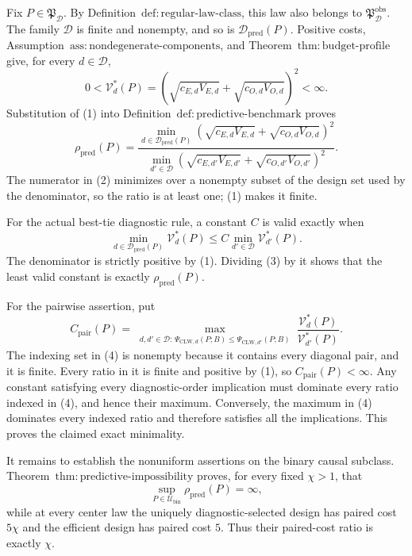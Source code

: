 Fix \(P\in\mathfrak P_{\mathcal D}\).  By Definition~\(\mathrm{def{:}regular\text{-}law\text{-}class}\), this law also belongs to \(\mathfrak P_{\mathcal D}^{\mathrm{obs}}\).  The family \(\mathcal D\) is finite and nonempty, and so is \(\mathcal D_{\mathrm{pred}}(P)\).  Positive costs, Assumption~\(\mathrm{ass{:}nondegenerate\text{-}components}\), and Theorem~\(\mathrm{thm{:}budget\text{-}profile}\) give, for every \(d\in\mathcal D\),
\[
 0<\mathcal V_d^*(P)
 =\left(\sqrt{c_{E,d}V_{E,d}}+
          \sqrt{c_{O,d}V_{O,d}}\right)^2<\infty.       \tag{1}
\]
Substitution of (1) into Definition~\(\mathrm{def{:}predictive\text{-}benchmark}\) proves
\[
 \rho_{\mathrm{pred}}(P)
 =\frac{\min_{d\in\mathcal D_{\mathrm{pred}}(P)}
 (\sqrt{c_{E,d}V_{E,d}}+\sqrt{c_{O,d}V_{O,d}})^2}
 {\min_{d'\in\mathcal D}
 (\sqrt{c_{E,d'}V_{E,d'}}+\sqrt{c_{O,d'}V_{O,d'}})^2}.
 \tag{2}
\]
The numerator in (2) minimizes over a nonempty subset of the design set used by the denominator, so the ratio is at least one; (1) makes it finite.

For the actual best-tie diagnostic rule, a constant \(C\) is valid exactly when
\[
 \min_{d\in\mathcal D_{\mathrm{pred}}(P)}\mathcal V_d^*(P)
 \le C\min_{d'\in\mathcal D}\mathcal V_{d'}^*(P).
 \tag{3}
\]
The denominator is strictly positive by (1).  Dividing (3) by it shows that the least valid constant is exactly \(\rho_{\mathrm{pred}}(P)\).

For the pairwise assertion, put
\[
 C_{\mathrm{pair}}(P)=
 \max_{\substack{d,d'\in\mathcal D:\,
 \Psi_{\mathrm{CLW},d}(P;B)\le
 \Psi_{\mathrm{CLW},d'}(P;B)}}
 \frac{\mathcal V_d^*(P)}{\mathcal V_{d'}^*(P)}.        \tag{4}
\]
The indexing set in (4) is nonempty because it contains every diagonal pair, and it is finite.  Every ratio in it is finite and positive by (1), so \(C_{\mathrm{pair}}(P)<\infty\).  Any constant satisfying every diagnostic-order implication must dominate every ratio indexed in (4), and hence their maximum.  Conversely, the maximum in (4) dominates every indexed ratio and therefore satisfies all the implications.  This proves the claimed exact minimality.

It remains to establish the nonuniform assertions on the binary causal subclass.  Theorem~\(\mathrm{thm{:}predictive\text{-}impossibility}\) proves, for every fixed \(\chi>1\), that
\[
 \sup_{P\in\mathcal U_{\mathrm{bin}}}
 \rho_{\mathrm{pred}}(P)=\infty,                         \tag{5}
\]
while at every center law the uniquely diagnostic-selected design has paired cost \(5\chi\) and the efficient design has paired cost \(5\).  Thus their paired-cost ratio is exactly \(\chi\).


